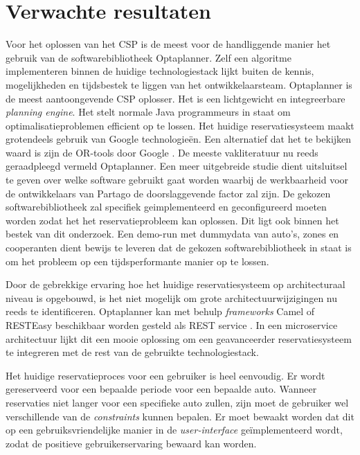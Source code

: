 \section{Verwachte resultaten}
\label{sec:verwachte_resultaten}
Voor het oplossen van het CSP is de meest voor de handliggende manier het gebruik van de softwarebibliotheek Optaplanner. Zelf een algoritme implementeren binnen de huidige technologiestack lijkt buiten de kennis, mogelijkheden en tijdsbestek te liggen van het ontwikkelaarsteam.
Optaplanner is de meest aantoongevende CSP oplosser. Het is een lichtgewicht en integreerbare \textit{planning engine}. Het stelt normale Java programmeurs in staat om optimalisatieproblemen efficient op te lossen. \autocite{optaplanner} Het huidige reservatiesysteem maakt grotendeels gebruik van Google technologieën. Een alternatief dat het te bekijken waard is zijn de OR-tools door Google \autocite{ortools}. De meeste vakliteratuur nu reeds geraadpleegd vermeld Optaplanner. Een meer uitgebreide studie dient uitsluitsel te geven over welke software gebruikt gaat worden waarbij de werkbaarheid voor de ontwikkelaars van Partago de doorslaggevende factor zal zijn. De gekozen softwarebibliotheek zal specifiek geimplementeerd en geconfigureerd moeten worden zodat het het reservatieprobleem kan oplossen. Dit ligt ook binnen het bestek van dit onderzoek. Een demo-run met dummydata van auto's, zones en cooperanten dient bewijs te leveren dat de gekozen softwarebibliotheek in staat is om het probleem op een tijdsperformante manier op te lossen. 

Door de gebrekkige ervaring hoe het huidige reservatiesysteem op architecturaal niveau is opgebouwd, is het niet mogelijk om grote architectuurwijzigingen nu reeds te identificeren. Optaplanner kan met behulp \textit{frameworks} Camel of RESTEasy beschikbaar worden gesteld als REST service \autocite{manualoptaplanner}. In een microservice architectuur lijkt dit een mooie oplossing om een geavanceerder reservatiesysteem te integreren met de rest van de gebruikte technologiestack.

Het huidige reservatieproces voor een gebruiker is heel eenvoudig. Er wordt gereserveerd voor een bepaalde periode voor een bepaalde auto. Wanneer reservaties niet langer voor een specifieke auto zullen, zijn moet de gebruiker wel verschillende van de \textit{constraints} kunnen bepalen. Er moet bewaakt worden dat dit op een gebruiksvriendelijke manier in de \textit{user-interface} geïmplementeerd wordt, zodat de positieve gebruikerservaring bewaard kan worden.

